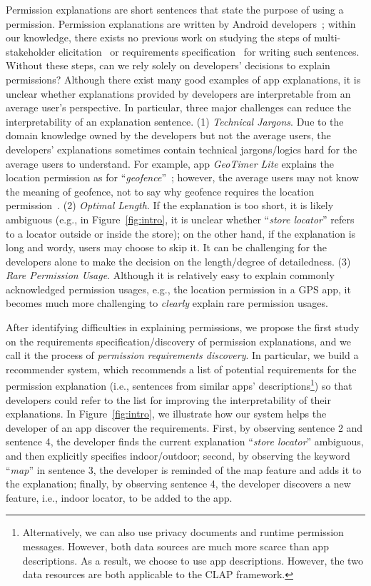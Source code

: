 Permission explanations are short sentences that state the purpose of using a permission. 
Permission explanations are written by Android developers~\cite{conf/chi/TanNTNTEW14}; 
within our knowledge, there exists no previous work on studying the steps of multi-stakeholder elicitation~\cite{requirementelicitation} or requirements  specification~\cite{requirementspecification} for writing such sentences. Without these steps, can we rely solely on developers' decisions to explain permissions? 
Although there exist many good examples of app explanations, it is unclear whether explanations provided by developers are interpretable from an average user's perspective. 
In particular, three major challenges can reduce the interpretability of an explanation sentence. 
(1) \emph{Technical Jargons}. Due to the domain knowledge owned by the developers but not the average users, the developers' explanations sometimes contain technical jargons/logics hard for the average users to understand. 
For example, app \emph{GeoTimer Lite} explains the location permission as for ``\emph{geofence}''~\cite{geolite}; however, the average users may not know the meaning of geofence, not to say why geofence requires the location permission~\cite{geofence}. 
(2) \emph{Optimal Length}. If the explanation is too short, it is likely ambiguous (e.g., in Figure~\ref{fig:intro}, it is unclear whether ``\emph{store locator}'' refers to a locator outside or inside the store); 
on the other hand, if the explanation is long and wordy, users may choose to skip it. 
It can be challenging for the developers alone to make the decision on the length/degree of detailedness.
(3) \emph{Rare Permission Usage}. Although it is relatively easy to explain commonly acknowledged permission usages, e.g., the location permission in a GPS app, it becomes much more challenging to \emph{clearly} explain rare permission usages. 

After identifying difficulties in explaining permissions, we propose the first study on the requirements specification/discovery of permission explanations, and we call it the process of \emph{permission requirements discovery}. 
In particular, we build a recommender system, which recommends a list of potential requirements for the permission explanation (i.e., sentences from similar apps' descriptions\footnote{Alternatively, we can also use privacy documents and runtime permission messages. However, both data sources are much more scarce than app descriptions. As a result, we choose to use app descriptions.
However, the two data resources are both applicable to the CLAP framework.}) so that developers could refer to the list for improving the interpretability of their explanations. 
In Figure~\ref{fig:intro}, we illustrate how our system helps the developer of an app discover the requirements. 
First, by observing sentence 2 and sentence 4, the developer finds the current explanation ``\emph{store locator}'' ambiguous, and then explicitly specifies indoor/outdoor; 
second, by observing the keyword ``\emph{map}'' in sentence 3, the developer is reminded of the map feature and adds it to the explanation; 
finally, by observing sentence 4, the developer discovers a new feature, i.e., indoor locator, to be added to the app. 

